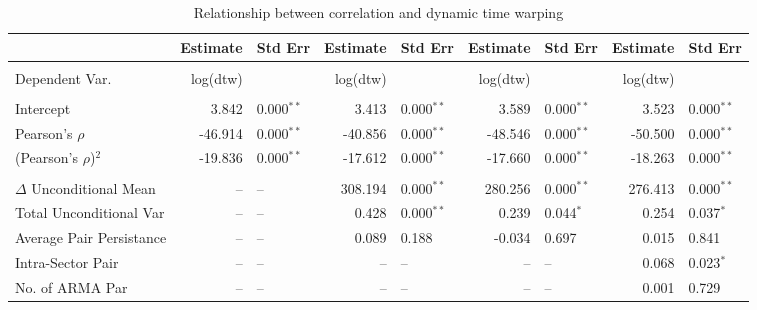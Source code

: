 \documentclass[12pt]{article}
\begin{document}
\begin{table}[!ht]
    \fontsize{8pt}{8pt}\selectfont
    \caption{Relationship between correlation and dynamic time warping}
    \centering
    \begin{tabular}{l r l r l r l r l}
        \midrule
         & Estimate & Std Err & Estimate & Std Err & Estimate & Std Err & Estimate & Std Err  \\
        \midrule
                                                                                                                                                  \\
        Dependent Var.               & log(dtw)&              & log(dtw)&               &     log(dtw)&                & log(dtw)&                \\
                                                                                                                                                  \\
        Intercept                    &   3.842 & 0.000$^{**}$ &   3.413 & 0.000$^{**}$  &       3.589 & 0.000$^{**}$   &   3.523 & 0.000$^{**}$   \\
        Pearson's $\rho$             & -46.914 & 0.000$^{**}$ & -40.856 & 0.000$^{**}$  &     -48.546 & 0.000$^{**}$   & -50.500 & 0.000$^{**}$   \\
        (Pearson's $\rho$)$^{2}$     & -19.836 & 0.000$^{**}$ & -17.612 & 0.000$^{**}$  &     -17.660 & 0.000$^{**}$   & -18.263 & 0.000$^{**}$   \\
                                                                                                                                                  \\        
        $\Delta$ Unconditional Mean  &      -- & --           & 308.194 & 0.000$^{**}$  &     280.256 & 0.000$^{**}$   & 276.413 & 0.000$^{**}$   \\
        Total Unconditional Var      &      -- & --           &   0.428 & 0.000$^{**}$  &       0.239 & 0.044$^{*}$    &   0.254 & 0.037$^{*}$    \\
        Average Pair Persistance          &      -- & --           &   0.089 & 0.188         &      -0.034 & 0.697          &   0.015 & 0.841          \\
        Intra-Sector Pair            &      -- & --           &      -- & --            &          -- & --             &   0.068 & 0.023$^{*}$    \\
        No. of ARMA Par              &      -- & --           &      -- & --            &          -- & --             &   0.001 & 0.729          \\

\end{tabular}
\end{table}
\end{document}
